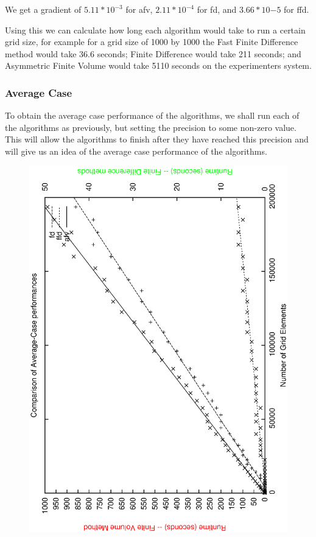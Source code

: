 \documentclass[aps,twocolumn,pre,nofootinbib,10pt]{revtex4-1}
\begin{document}
We get a gradient of $5.11*10^{-3}$ for afv, $2.11*10^{-4}$ for fd, and $3.66*10{-5}$ for ffd.

Using this we can calculate how long each algorithm would take to run a certain grid size, for example for a grid size of 1000 by 1000 the Fast Finite Difference method would take 36.6 seconds; Finite Difference would take 211 seconds; and Asymmetric Finite Volume would take 5110 seconds on the experimenters system.

\subsubsection{Average Case}

To obtain the average case performance of the algorithms, we shall run each of the algorithms as previously, but setting the precision to some non-zero value. This will allow the algorithms to finish after they have reached this precision and will give us an idea of the average case performance of the algorithms.

\begin{figure}
    \begin{center}
        \includegraphics*[angle=-90,width=\columnwidth]{comparison_ac.ps}
    \end{center}
\end{figure}
\end{document}
